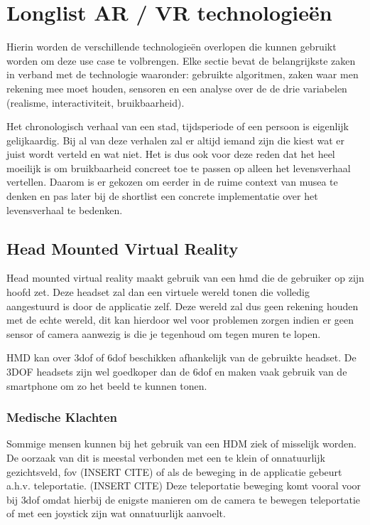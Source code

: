 \chapter{Longlist AR / VR technologieën}
\label{ch:longlist}

Hierin worden de verschillende technologieën overlopen die kunnen gebruikt worden om deze use case te volbrengen.
Elke sectie bevat de belangrijkste zaken in verband met de technologie waaronder: gebruikte algoritmen, zaken waar men rekening mee moet houden, sensoren en een analyse over de de drie variabelen (realisme, interactiviteit, bruikbaarheid).

Het chronologisch verhaal van een stad, tijdsperiode of een persoon is eigenlijk gelijkaardig. Bij al van deze verhalen zal er altijd iemand zijn die kiest wat er juist wordt verteld en wat niet. Het is dus ook voor deze reden dat het heel moeilijk is om bruikbaarheid concreet toe te passen op alleen het levensverhaal vertellen. Daarom is er gekozen om eerder in de ruime context van musea te denken en pas later bij de shortlist een concrete implementatie over het levensverhaal te bedenken. 

\section{Head Mounted Virtual Reality}
Head mounted virtual reality maakt gebruik van een \acrshort{hmd} die de gebruiker op zijn hoofd zet. Deze headset zal dan een virtuele wereld tonen die volledig aangestuurd is door de applicatie zelf. Deze wereld zal dus geen rekening houden met de echte wereld, dit kan hierdoor wel voor problemen zorgen indien er geen sensor of camera aanwezig is die je tegenhoud om tegen muren te lopen.

HMD kan over \acrshort{3dof} of \acrshort{6dof} beschikken afhankelijk van de gebruikte headset. De 3DOF headsets zijn wel goedkoper dan de \acrshort{6dof} en maken vaak gebruik van de smartphone om zo het beeld te kunnen tonen. 
\subsection{Medische Klachten}
Sommige mensen kunnen bij het gebruik van een HDM ziek of misselijk worden. De oorzaak van dit is meestal verbonden met een te klein of onnatuurlijk gezichtsveld, \acrfull{fov} (INSERT CITE) of als de beweging in de applicatie gebeurt a.h.v. teleportatie. (INSERT CITE) Deze teleportatie beweging komt vooral voor bij \acrshort{3dof} omdat hierbij de enigste manieren om de camera te bewegen teleportatie of met een joystick zijn wat onnatuurlijk aanvoelt.

